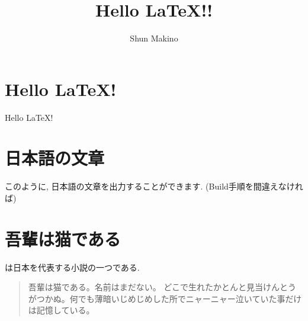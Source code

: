 \documentclass{ltjsarticle}
\begin{document}
\title{Hello \LaTeX !!}
\author{Shun Makino}
\date{}

\section{Hello \LaTeX!}
Hello \LaTeX !

\section{日本語の文章}
このように, 日本語の文章を出力することができます. (Build手順を間違えなければ)

\section{吾輩は猫である}
\cite{neko}は日本を代表する小説の一つである.
\begin{quote}
    吾輩は猫である。名前はまだない。
    どこで生れたかとんと見当けんとうがつかぬ。何でも薄暗いじめじめした所でニャーニャー泣いていた事だけは記憶している。
\end{quote}



\end{document}
